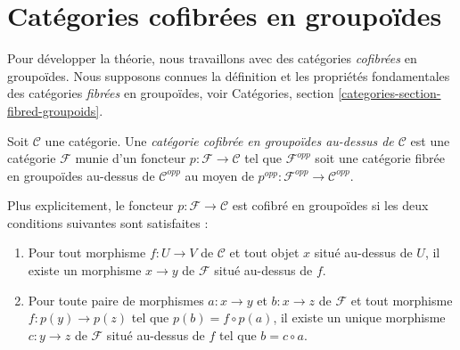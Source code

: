 \section{Catégories cofibrées en groupoïdes}
\label{section-preliminary}

\noindent
Pour développer la théorie, nous travaillons avec des catégories {\it cofibrées}
en groupoïdes. Nous supposons connues la définition et les propriétés
fondamentales des catégories {\it fibrées} en groupoïdes, voir
Catégories, section \ref{categories-section-fibred-groupoids}.

\begin{definition}
\label{definition-category-cofibred-groupoids}
Soit $\mathcal{C}$ une catégorie. Une {\it catégorie cofibrée en groupoïdes
au-dessus de $\mathcal{C}$} est une catégorie $\mathcal{F}$ munie d'un foncteur
$p: \mathcal{F} \to \mathcal{C}$ tel que $\mathcal{F}^{opp}$ soit une catégorie
fibrée en groupoïdes au-dessus de $\mathcal{C}^{opp}$ au moyen de
$p^{opp}: \mathcal{F}^{opp} \to \mathcal{C}^{opp}$.
\end{definition}

\noindent
Plus explicitement, le foncteur $p: \mathcal{F} \to \mathcal{C}$ est cofibré
en groupoïdes si les deux conditions suivantes sont satisfaites :
\begin{enumerate}
\item Pour tout morphisme $f: U \to V$ de $\mathcal{C}$ et tout objet
$x$ situé au-dessus de $U$, il existe un morphisme $x \to y$ de $\mathcal{F}$
situé au-dessus de $f$.
\item Pour toute paire de morphismes $a: x \to y$ et $b: x \to z$
de $\mathcal{F}$ et tout morphisme $f: p(y) \to p(z)$ tel que $p(b) = f
\circ p(a)$, il existe un unique morphisme $c: y \to z$ de $\mathcal
F$ situé au-dessus de $f$ tel que $b = c \circ a$.
\end{enumerate}


